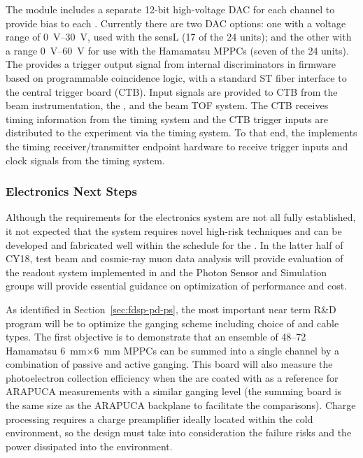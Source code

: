 The module includes a separate \num{12}-bit high-voltage DAC for each channel to provide bias to each . Currently there are two DAC options: one with a voltage range of \SIrange{0}{30}{V}, used with the sensL  (\num{17} of the \num{24}  units); and the other with a range \SIrange{0}{60}{V} for use with the Hamamatsu MPPCs (seven of the 24  units). The  provides a trigger output signal from internal discriminators in firmware based on programmable coincidence logic, with a standard ST fiber interface to the central trigger board (CTB).
Input signals are provided to CTB from the beam instrumentation, the , and the beam TOF system. The CTB receives timing information from 
the  timing system and the CTB trigger inputs are distributed to the experiment via the timing system.
To that end, the  implements the timing receiver/transmitter endpoint hardware to receive trigger inputs and clock signals from the timing system.


\subsubsection{Electronics Next Steps}

Although the requirements for the electronics system are not all fully established, it not expected that the system requires novel high-risk techniques and can be developed and fabricated well within the schedule for the .
In the latter half of CY18,  test beam and cosmic-ray muon data analysis will provide evaluation of the readout system implemented in  and the  Photon Sensor and Simulation groups will provide essential guidance on optimization of performance and cost.

As identified in Section~\ref{sec:fdsp-pd-ps}, the most important near term R\&D program will be to optimize the ganging scheme including choice of  and cable types. 
The first objective is to demonstrate that an ensemble of \numrange{48}{72} Hamamatsu \SI{6}{mm}$\times$\SI{6}{mm} MPPCs can be summed into a single channel by a combination of passive and active ganging. This board will also measure the photoelectron collection efficiency when the  are coated with  as a reference for ARAPUCA measurements with a similar ganging level (the summing  board is the same size as the  ARAPUCA backplane to facilitate the comparisons).
Charge processing requires a charge preamplifier ideally located within the cold environment, so the design must take into consideration the failure risks and the power dissipated into the environment.

